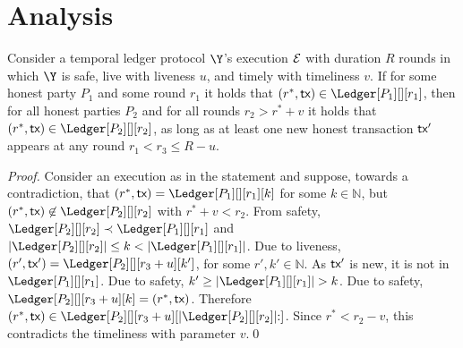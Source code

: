 \section{Analysis}


\begin{lemma}\label{lem:past-perfect}
  Consider a temporal ledger protocol $\Y$'s
  execution $\mathcal{E}$ with duration $R$ rounds in which $\Y$ is
  safe, live with liveness $u$, and timely with timeliness $v$.
  If for some honest party $P_1$ and some round $r_1$ it holds that
  $(r^*, \tx) \in \Ledger[P_1][][r_1]$, then
  for all honest parties $P_2$ and for all rounds $r_2 > r^* + v$
  it holds that
  $(r^*, \tx) \in \Ledger[P_2][][r_2]$,
  as long as at least one new honest transaction $\textsf{tx}'$ appears at
  any round $r_1 < r_3 \leq R - u$.
\end{lemma}
\begin{proof}
  Consider an execution as in the statement and suppose, towards a contradiction,
  that $(r^*, \tx) = \Ledger[P_1][][r_1][k]$ for some $k \in \mathbb{N}$,
  but $(r^*, \tx) \not\in \Ledger[P_2][][r_2]$
  with $r^* + v < r_2$.
  From safety,
  $\Ledger[P_2][][r_2] \prec \Ledger[P_1][][r_1]$ and
  $|\Ledger[P_2][][r_2]| \leq k < |\Ledger[P_1][][r_1]|$.
  Due to liveness, $(r', \tx') = \Ledger[P_2][][r_3 + u][k']$,
  for some $r', k' \in \mathbb{N}$.
  As $\textsf{tx}'$ is new, it is not in $\Ledger[P_1][][r_1]$.
  Due to safety, $k' \geq |\Ledger[P_1][][r_1]| > k$.
  Due to safety, $\Ledger[P_2][][r_3 + u][k] = (r^*, \tx)$.
  Therefore
  $(r^*, \tx) \in \Ledger[P_2][][r_3 + u][|\Ledger[P_2][][r_2]|{:}]$.
  Since $r^* < r_2 - v$, this contradicts the timeliness with parameter $v$.\qed
\end{proof}

